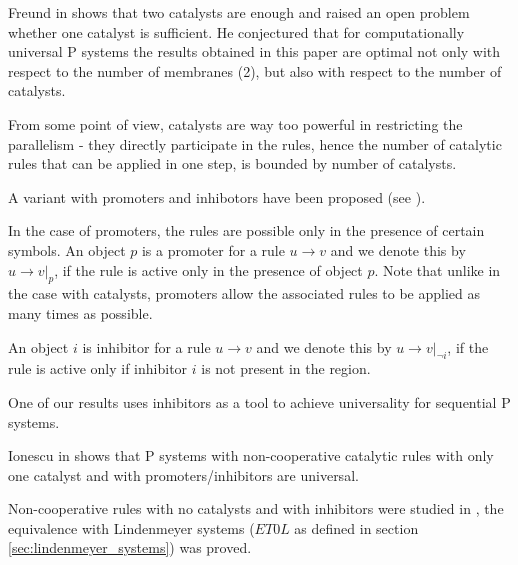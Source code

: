 
Freund in \cite{Freund2005TwoCatalysts} shows that two catalysts are enough and raised an open problem whether one catalyst is sufficient. He conjectured that for computationally universal P systems the results obtained in this paper are optimal not only with respect to the number of membranes (2), but also with respect to the number of catalysts.


From some point of view, catalysts are way too powerful in restricting the parallelism - they directly participate in the rules, hence the number of catalytic rules that can be applied in one step, is bounded by number of catalysts.

A variant with promoters and inhibotors have been proposed (see \cite{Ionescu:jucs_10_5:on_p_systems_with}).


In the case of promoters, the rules are possible only in the presence of certain symbols. An object $p$ is a promoter for a rule $u\rightarrow v$ and we denote this by $u\rightarrow v|_{p}$, if the rule is active only in the presence of object $p$. Note that unlike in the case with catalysts, promoters allow the associated rules to be applied as many times as possible.


An object $i$ is inhibitor for a rule $u\rightarrow v$ and we denote this by $u\rightarrow v|_{\neg i}$, if the rule is active only if inhibitor $i$ is not present in the region.


One of our results uses inhibitors as a tool to achieve universality for sequential P systems.



Ionescu in \cite{Ionescu:jucs_10_5:on_p_systems_with} shows that P systems with non-cooperative catalytic rules with only one catalyst and with promoters/inhibitors are universal.


Non-cooperative rules with no catalysts and with inhibitors were studied in \cite{Sburlan:2006:FurtherResultsPromotersInhibitors}, the equivalence with Lindenmeyer systems ($ET0L$ as defined in section \ref{sec:lindenmeyer_systems}) was proved.


